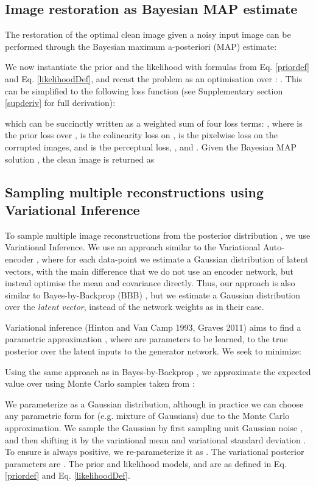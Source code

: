 \documentclass{article}
\begin{document}
\subsection{Image restoration as Bayesian MAP estimate}
\label{bayesianmap}
The restoration of the optimal clean image  given a noisy input image  can be performed through the Bayesian maximum a-posteriori (MAP) estimate:




We now instantiate the prior  and the likelihood  with formulas from Eq. \ref{priordef} and Eq. \ref{likelihoodDef}, and recast the problem as an optimisation over : . This can be simplified to the following loss function (see Supplementary section \ref{supderiv} for full derivation):

which can be succinctly written as a weighted sum of four loss terms: , where  is the prior loss over ,  is the colinearity loss on ,  is the pixelwise loss on the corrupted images, and  is the perceptual loss, ,  and . Given the Bayesian MAP solution , the clean image is returned as 

\subsection{Sampling multiple reconstructions using Variational Inference}
\label{samplingmethod}

To sample multiple image reconstructions from the posterior distribution , we use Variational Inference. We use an approach similar to the Variational Auto-encoder \cite{kingma2013auto,rezende2014stochastic}, where for each data-point we estimate a Gaussian distribution of latent vectors, with the main difference that we do not use an encoder network, but instead optimise the mean and covariance directly. Thus, our approach is also similar to Bayes-by-Backprop (BBB) \cite{blundell2015weight}, but we estimate a Gaussian distribution over the \emph{latent vector}, instead of the network weights as in their case.  

Variational inference (Hinton and Van Camp 1993, Graves 2011) aims to find a parametric approximation , where  are parameters to be learned, to the true posterior  over the latent inputs  to the generator network. We seek to minimize:

Using the same approach as in Bayes-by-Backprop \cite{blundell2015weight}, we approximate the expected value over  using Monte Carlo samples  taken from :

We parameterize  as a Gaussian distribution, although in practice we can choose any parametric form for  (e.g. mixture of Gaussians) due to the Monte Carlo approximation. We sample the Gaussian by first sampling unit Gaussian noise , and then shifting it by the variational mean  and variational standard deviation . To ensure  is always positive, we re-parameterize it as . The variational posterior parameters are . The prior and likelihood models,  and  are as defined in Eq. \ref{priordef} and Eq. \ref{likelihoodDef}.
\end{document}

